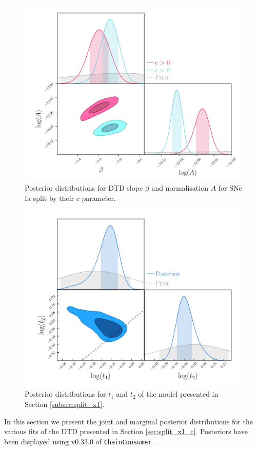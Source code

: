 \documentclass[fleqn,usenatbib]{mnras}
\begin{document}
\begin{figure}
    \centering
    \includegraphics[width=.5\textwidth]{figs/fit_dtd_split_c_A_beta_corner.pdf}
    \caption{Posterior distributions for DTD slope $\beta$ and normalisation $A$ for SNe Ia split by their $c$ parameter.%
    \label{fig:corner_beta_norm_split_c}}
\end{figure}
\begin{figure}
    \centering
    \includegraphics[width=.5\textwidth]{figs/fitjoint_t1_t2_corner.pdf}
    \caption{Posterior distributions for $t_1$ and $t_2$ of the model presented in Section \ref{subsec:split_x1}.%
    \label{fig:corner_t1_t2}}
\end{figure}
In this section we present the joint and marginal posterior distributions for the various fits of the DTD presented in Section \ref{sec:split_x1_c}. Posteriors have been displayed using v0.33.0 of \texttt{ChainConsumer} \citep{Hinton2016}.
\clearpage
\onecolumn
\end{document}
